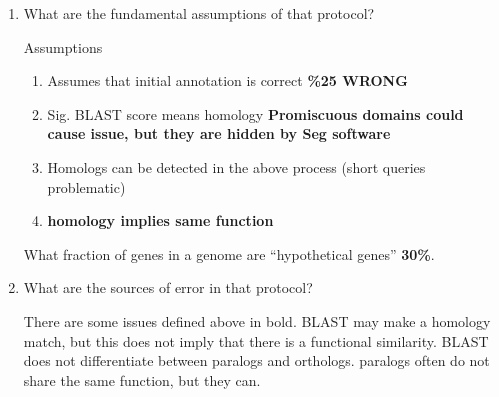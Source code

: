 \documentclass[11pt]{article}
\begin{document}
\begin{enumerate}
\item What are the fundamental assumptions of that protocol?

Assumptions
\begin{enumerate}
  \item Assumes that initial annotation is correct {\bf \%25 WRONG}
  \item Sig. BLAST score means homology {\bf Promiscuous domains could cause issue, but they are hidden by Seg software}
  \item Homologs can be detected in the above process (short queries problematic)
  \item {\bf homology implies same function}
\end{enumerate}

What fraction of genes in a genome are ``hypothetical genes'' {\bf 30\%}.

\item What are the sources of error in that protocol?

There are some issues defined above in bold. BLAST may make a homology match,
but this does not imply that there is a functional similarity. BLAST does 
not differentiate between paralogs and orthologs. paralogs often do not share
the same function, but they can. 


\end{enumerate}
\end{document}

